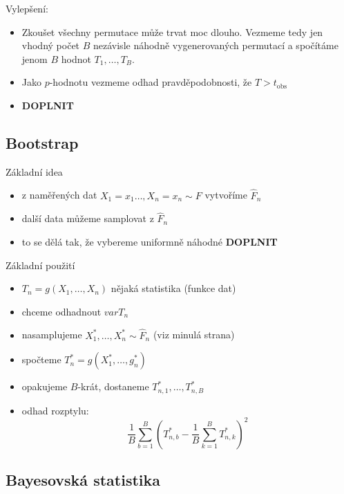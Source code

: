 \documentclass[../main.tex]{subfiles}
\begin{document}
\begin{example}
\begin{itemize}
    \end{itemize}
    Vylepšení:
    \begin{itemize}
        \item Zkoušet všechny permutace může trvat moc dlouho. Vezmeme tedy jen vhodný počet $B$ nezávisle náhodně vygenerovaných permutací a spočítáme jenom
        $B$ hodnot $T_1,\dots,T_B$.
        \item Jako $p$-hodnotu vezmeme odhad pravděpodobnosti, že $T > t_{\text{obs}}$
        \item \textbf{DOPLNIT} 
    \end{itemize}
\end{example}

\subsection{Bootstrap}

\begin{example}
    Základní idea
    \begin{itemize}
        \item z naměřených dat $X_1 = x_1 \dots,X_n = x_n \sim F$ vytvoříme $\widehat{F}_n$
        \item další data můžeme samplovat z $\widehat{F}_n$
        \item to se dělá tak, že vybereme uniformně náhodné \textbf{DOPLNIT}
    \end{itemize}
    Základní použití
    \begin{itemize}
        \item $T_n = g(X_1,\dots,X_n)$ nějaká statistika (funkce dat)
        \item chceme odhadnout $var T_n$
        \item nasamplujeme $X^*_1,\dots,X^*_n \sim \widehat{F}_n$ (viz minulá strana)
        \item spočteme $T^*_n = g(X^*_1,\dots,g^*_n)$
        \item opakujeme $B$-krát, dostaneme $T^*_{n,1},\dots,T^*_{n,B}$
        \item odhad rozptylu:
        \[\frac{1}{B}\sum^{B}_{b=1}\left(T^*_{n,b}-\frac{1}{B}\sum^{B}_{k=1}T^*_{n,k}\right)^2\]
    \end{itemize}
\end{example}

\subsection{Bayesovská statistika}
\end{document}
